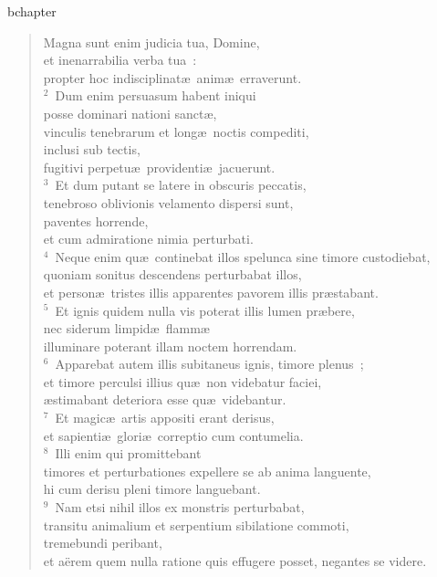 bchapter\begin{flushleft}\begin{verse}\vspace{-19pt}\hspace{6pt}Magna sunt enim judicia tua, Domine,\\\hspace{6pt} et inenarrabilia verba tua~:\\ propter hoc indisciplinat\ae\ anim\ae\ erraverunt.\\
${}^{2}$~Dum enim persuasum habent iniqui\\ posse dominari nationi sanct\ae ,\\ vinculis tenebrarum et long\ae\ noctis compediti,\\ inclusi sub tectis,\\ fugitivi perpetu\ae\ providenti\ae\ jacuerunt.\\
${}^{3}$~Et dum putant se latere in obscuris peccatis,\\ tenebroso oblivionis velamento dispersi sunt,\\ paventes horrende,\\ et cum admiratione nimia perturbati.\\
${}^{4}$~Neque enim qu\ae\ continebat illos spelunca sine timore custodiebat,\\ quoniam sonitus descendens perturbabat illos,\\ et person\ae\ tristes illis apparentes pavorem illis pr\ae stabant.\\
${}^{5}$~Et ignis quidem nulla vis poterat illis lumen pr\ae bere,\\ nec siderum limpid\ae\ flamm\ae \\ illuminare poterant illam noctem horrendam.\\
${}^{6}$~Apparebat autem illis subitaneus ignis, timore plenus~;\\ et timore perculsi illius qu\ae\ non videbatur faciei,\\ \ae stimabant deteriora esse qu\ae\ videbantur.\\
${}^{7}$~Et magic\ae\ artis appositi erant derisus,\\ et sapienti\ae\ glori\ae\ correptio cum contumelia.\\
${}^{8}$~Illi enim qui promittebant\\ timores et perturbationes expellere se ab anima languente,\\ hi cum derisu pleni timore languebant.\\
${}^{9}$~Nam etsi nihil illos ex monstris perturbabat,\\ transitu animalium et serpentium sibilatione commoti,\\ tremebundi peribant,\\ et a\"erem quem nulla ratione quis effugere posset, negantes se videre.\\

\end{verse}
\end{flushleft}

